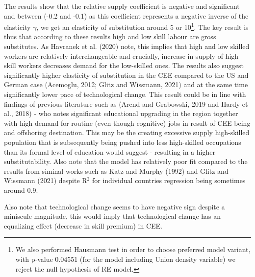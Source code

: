 \documentclass{article}
\begin{document}
The results show that the relative supply coefficient is negative and significant and between (-0.2 and -0.1) as this coefficient represents a negative inverse of the elasticity $\gamma$, we get an elasticity of substitution around 5 or 10\footnote{We also performed Hausmann test in order to choose preferred model variant, with p-value 0.04551 (for the model including Union density variable) we reject the null hypothesis of RE model.}. The key result is thus that according to these results high and low skill labour are gross substitutes. As Havranek et al. (2020) note, this implies that high and low skilled workers are relatively interchangeable and crucially, increase in supply of high skill workers decreases demand for the low-skilled ones. The results also suggest significantly higher elasticity of substitution in the CEE compared to the US and German case (Acemoglu, 2012; Glitz and Wissmann, 2021) and at the same time significantly lower pace of technological change. This result could be in line with findings of previous literature such as (Arend and Grabowski, 2019 and Hardy et al., 2018) - who notes significant educational upgrading in the region together with high demand for routine (even though cognitive) jobs in result of CEE being and offshoring destination. This may be the creating excessive supply high-skilled population that is subsequently being pushed into less high-skilled occupations than its formal level of education would suggest - resulting in a higher substitutability.
Also note that the model has relatively poor fit compared to the results from siminal works such as Katz and Murphy (1992) and Glitz and Wissmann (2021) despite R$^{2}$ for individual countries regression being sometimes around 0.9.

Also note that technological change seems to have negative sign despite a miniscule magnitude, this would imply that technological change has an equalizing effect (decrease in skill premium) in CEE.


\end{document}
